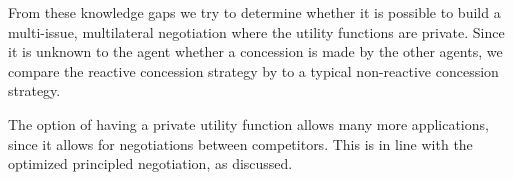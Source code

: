 From these knowledge gaps we try to determine whether it is possible to build a multi-issue, multilateral negotiation where the utility functions are private. Since it is unknown to the agent whether a concession is made by the other agents, we compare the reactive concession strategy by \citet{zheng2015automated} to a typical non-reactive concession strategy.

The option of having a private utility function allows many more applications, since it allows for negotiations between competitors. This is in line with the optimized principled negotiation, as discussed.